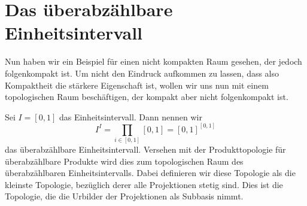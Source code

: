 \documentclass[11pt]{scrartcl}
\begin{document}
\section{Das überabzählbare Einheitsintervall}
Nun haben wir ein Beispiel für einen nicht kompakten Raum gesehen, der jedoch folgenkompakt ist.
Um nicht den Eindruck aufkommen zu lassen, dass also Kompaktheit die stärkere Eigenschaft ist,
wollen wir uns nun mit einem topologischen Raum beschäftigen, der kompakt aber nicht folgenkompakt ist.
\begin{definition}
	Sei $I=[0,1]$ das Einheitsintervall. Dann nennen wir $$I^I=\prod_{i\in [0,1]}[0,1]=[0,1]^{[0,1]}$$ das 
	überabzählbare Einheitsintervall. Versehen mit der Produkttopologie für überabzählbare Produkte wird dies zum topologischen
	Raum des überabzählbaren Einheitsintervalls. Dabei definieren wir diese Topologie als die kleinste Topologie, bezüglich derer alle 
	Projektionen stetig sind. Dies ist die Topologie, die die Urbilder der Projektionen als Subbasis nimmt.
\end{definition}
\end{document}
